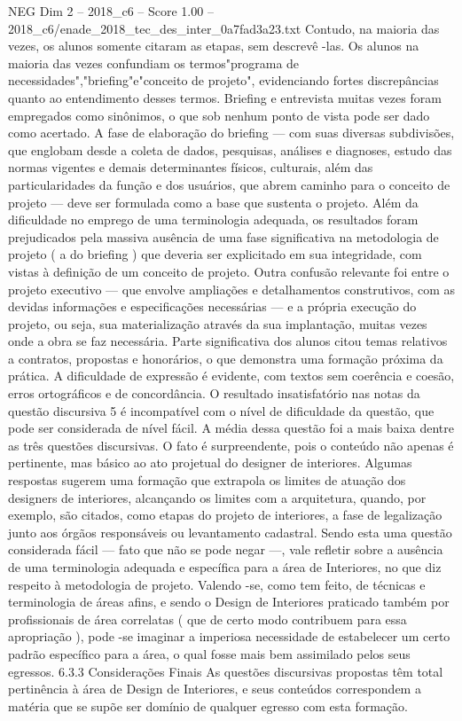 \begin{textsample}{NEG Dim 2 – 2018\_c6 – Score 1.00 – 2018\_c6/enade\_2018\_tec\_des\_inter\_0a7fad3a23.txt}
Contudo, na maioria das vezes, os alunos somente citaram as etapas, sem descrevê -las.
Os alunos na maioria das vezes confundiam os termos"programa de necessidades","briefing"e"conceito de projeto", evidenciando fortes discrepâncias quanto ao entendimento desses termos.
Briefing e entrevista muitas vezes foram empregados como sinônimos, o que sob nenhum ponto de vista pode ser dado como acertado.
A fase de elaboração do briefing — com suas diversas subdivisões, que englobam desde a coleta de dados, pesquisas, análises e diagnoses, estudo das normas vigentes e demais determinantes físicos, culturais, além das particularidades da função e dos usuários, que abrem caminho para o conceito de projeto — deve ser formulada como a base que sustenta o projeto.
Além da dificuldade no emprego de uma terminologia adequada, os resultados foram prejudicados pela massiva ausência de uma fase significativa na metodologia de projeto ( a do briefing ) que deveria ser explicitado em sua integridade, com vistas à definição de um conceito de projeto.
Outra confusão relevante foi entre o projeto executivo — que envolve ampliações e detalhamentos construtivos, com as devidas informações e especificações necessárias — e a própria execução do projeto, ou seja, sua materialização através da sua implantação, muitas vezes onde a obra se faz necessária.
Parte significativa dos alunos citou temas relativos a contratos, propostas e honorários, o que demonstra uma formação próxima da prática.
A dificuldade de expressão é evidente, com textos sem coerência e coesão, erros ortográficos e de concordância.
O resultado insatisfatório nas notas da questão discursiva 5 é incompatível com o nível de dificuldade da questão, que pode ser considerada de nível fácil.
A média dessa questão foi a mais baixa dentre as três questões discursivas.
O fato é surpreendente, pois o conteúdo não apenas é pertinente, mas básico ao ato projetual do designer de interiores.
Algumas respostas sugerem uma formação que extrapola os limites de atuação dos designers de interiores, alcançando os limites com a arquitetura, quando, por exemplo, são citados, como etapas do projeto de interiores, a fase de legalização junto aos órgãos responsáveis ou levantamento cadastral.
Sendo esta uma questão considerada fácil — fato que não se pode negar —, vale refletir sobre a ausência de uma terminologia adequada e específica para a área de Interiores, no que diz respeito à metodologia de projeto.
Valendo -se, como tem feito, de técnicas e terminologia de áreas afins, e sendo o Design de Interiores praticado também por profissionais de área correlatas ( que de certo modo contribuem para essa apropriação ), pode -se imaginar a imperiosa necessidade de estabelecer um certo padrão específico para a área, o qual fosse mais bem assimilado pelos seus egressos. 6.3.3 Considerações Finais As questões discursivas propostas têm total pertinência à área de Design de Interiores, e seus conteúdos correspondem a matéria que se supõe ser domínio de qualquer egresso com esta formação.

\end{textsample}
